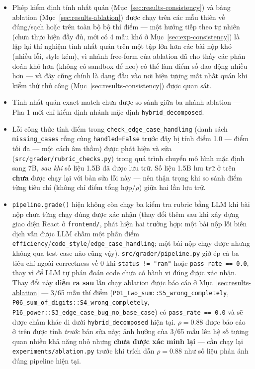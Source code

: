 \documentclass[a4paper,12pt]{report}
\begin{document}
\begin{itemize}
  \item Phép kiểm định tính nhất quán (Mục~\ref{sec:results-consistency})
    và bảng ablation (Mục~\ref{sec:results-ablation}) được chạy trên các
    mẫu thiên về đúng/sạch hoặc trên toàn bộ bộ thí điểm — một hướng tiếp
    theo tự nhiên (chưa thực hiện đầy đủ, mới có 4 mẫu khó ở
    Mục~\ref{sec:exp-consistency}) là lặp lại thí nghiệm tính nhất quán
    trên một tập lớn hơn các bài nộp khó (nhiều lỗi, style kém), vì nhánh
    free-form của ablation đã cho thấy các phán đoán khó hơn (không có
    sandbox để neo) có thể làm điểm số dao động nhiều hơn — và đây cũng
    chính là dạng đầu vào nơi hiện tượng mất nhất quán khi kiểm thử thủ
    công (Mục~\ref{sec:results-consistency}) được quan sát.
  \item Tính nhất quán exact-match chưa được so sánh giữa ba nhánh ablation
    — Pha 1 mới chỉ kiểm định nhánh mặc định \texttt{hybrid\_decomposed}.
  \item Lỗi công thức tính điểm trong \texttt{check\_edge\_case\_handling}
    (danh sách \texttt{missing\_cases} rỗng cùng \texttt{handled=False}
    trước đây bị tính điểm 1.0 — điểm tối đa — một cách âm thầm) được phát
    hiện và sửa (\texttt{src/grader/rubric\_checks.py}) trong quá trình
    chuyển mô hình mặc định sang 7B, \emph{sau khi} số liệu 1.5B đã được
    lưu trữ. Số liệu 1.5B lưu trữ ở trên \textbf{chưa} được chạy lại với
    bản sửa lỗi này — nên thận trọng khi so sánh điểm từng tiêu chí (không
    chỉ điểm tổng hợp/$\rho$) giữa hai lần lưu trữ.
  \item \texttt{pipeline.grade()} hiện không còn chạy ba kiểm tra rubric
    bằng LLM khi bài nộp chưa từng chạy đúng được xác nhận (thay đổi thêm
    sau khi xây dựng giao diện React ở \texttt{frontend/}, phát hiện hai
    trường hợp: một bài nộp lỗi biên dịch vẫn được LLM chấm một phần điểm
    \texttt{efficiency}/\texttt{code\_style}/\texttt{edge\_case\_handling};
    một bài nộp chạy được nhưng không qua test case nào cũng vậy).
    \texttt{src/grader/pipeline.py} giờ ép cả ba tiêu chí ngoài correctness
    về 0 khi \texttt{status != "ran"} hoặc \texttt{pass\_rate == 0.0}, thay
    vì để LLM tự phán đoán code chưa có hành vi đúng được xác nhận. Thay
    đổi này \textbf{diễn ra sau} lần chạy ablation được báo cáo ở
    Mục~\ref{sec:results-ablation} — 3/65 mẫu thí điểm
    (\texttt{P01\_two\_sum::S5\_wrong\_completely},
    \texttt{P06\_sum\_of\_digits::S4\_wrong\_completely},
    \texttt{P16\_power::S3\_edge\_case\_bug\_no\_base\_case}) có
    \texttt{pass\_rate == 0.0} và sẽ được chấm khác đi dưới
    \texttt{hybrid\_decomposed} hiện tại. $\rho=0.88$ được báo cáo ở trên
    được tính \emph{trước} bản sửa này; ảnh hưởng của 3/65 mẫu lên hệ số
    tương quan nhiều khả năng nhỏ nhưng \textbf{chưa được xác minh lại} —
    cần chạy lại \texttt{experiments/ablation.py} trước khi trích dẫn
    $\rho=0.88$ như số liệu phản ánh đúng pipeline hiện tại.
\end{itemize}
\end{document}

